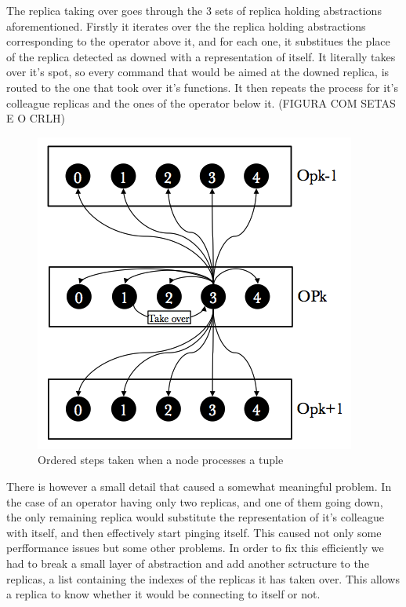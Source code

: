 \documentclass[times, 10pt,twocolumn]{article}
\begin{document}

The replica taking over goes through the 3 sets of replica holding abstractions aforementioned.
Firstly it iterates over the the replica holding abstractions corresponding to the operator above it, and for each one, it substitues the place of the replica detected as downed with a representation of itself. It literally takes over it's spot, so every command that would be aimed at the downed replica, is routed to the one that took over it's functions.
It then repeats the process for it's colleague replicas and the ones of the operator below it. (FIGURA COM SETAS E O CRLH)

\begin{figure}[h] 
	\includegraphics[width=\columnwidth]{take_over}
	\caption{Ordered steps taken when a node processes a tuple}
\end{figure}

There is however a small detail that caused a somewhat meaningful problem. In the case of an operator having only two replicas, and one of them going down, the only remaining replica would substitute the representation of it's colleague with itself, and then effectively start pinging itself. This caused not only some perfformance issues but some other problems.
In order to fix this efficiently we had to break a small layer of abstraction and add another sctructure to the replicas, a list containing the indexes of the replicas it has taken over. This allows a replica to know whether it would be connecting to itself or not.
\end{document}
